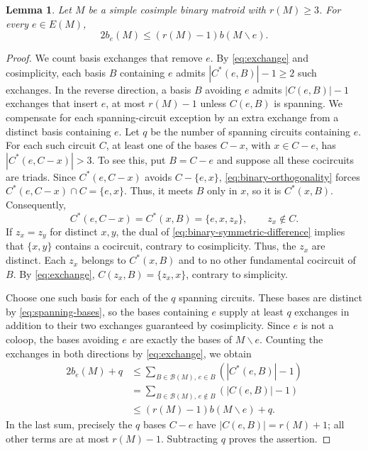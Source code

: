 \documentclass[10pt,a4paper]{article}
\numberwithin{equation}{section}
\newtheorem{lemma}[lemma]{Lemma}
\newcommand{\BB}{\mathcal B}
\begin{document}
\begin{lemma}\label{lem:exchange-count}
Let \(M\) be a simple cosimple binary matroid with \(r(M)\ge3\).
For every \(e\in E(M)\),
\[
 2b_e(M)\le(r(M)-1)b(M\backslash e).
\]
\end{lemma}
\begin{proof}
We count basis exchanges that remove \(e\). By \eqref{eq:exchange}
and cosimplicity, each basis \(B\) containing \(e\) admits
\(|C^*(e,B)|-1\ge2\) such exchanges. In the reverse direction,
a basis \(B\) avoiding \(e\) admits \(|C(e,B)|-1\) exchanges that
insert \(e\), at most \(r(M)-1\) unless \(C(e,B)\) is spanning.
We compensate for each spanning-circuit exception by an extra exchange
from a distinct basis containing \(e\).
Let \(q\) be the number of spanning circuits containing \(e\).
For each such circuit \(C\), at least one of the bases
\(C-x\), with \(x\in C-e\), has \(|C^*(e,C-x)|>3\).
To see this, put \(B=C-e\) and suppose all these cocircuits
are triads. Since \(C^*(e,C-x)\) avoids \(C-\{e,x\}\),
\eqref{eq:binary-orthogonality} forces
\(C^*(e,C-x)\cap C=\{e,x\}\).
Thus, it meets \(B\) only in \(x\), so it is \(C^*(x,B)\).
Consequently,
\[
 C^*(e,C-x)=C^*(x,B)=\{e,x,z_x\},\qquad z_x\notin C.
\]
If \(z_x=z_y\) for distinct \(x,y\), the dual of
\eqref{eq:binary-symmetric-difference} implies that
\(\{x,y\}\) contains a cocircuit, contrary to cosimplicity.
Thus, the \(z_x\) are distinct. Each \(z_x\) belongs to
\(C^*(x,B)\) and to no other fundamental cocircuit of \(B\).
By \eqref{eq:exchange}, \(C(z_x,B)=\{z_x,x\}\), contrary
to simplicity.

Choose one such basis for each of the \(q\) spanning circuits.
These bases are distinct by \eqref{eq:spanning-bases}, so the
bases containing \(e\) supply at least \(q\) exchanges in addition
to their two exchanges guaranteed by cosimplicity.
Since \(e\) is not a coloop, the bases avoiding \(e\) are exactly
the bases of \(M\backslash e\).
Counting the exchanges in both directions by \eqref{eq:exchange}, we obtain
\begin{align*}
 2b_e(M)+q
 &\le\sum_{B\in\BB(M),\,e\in B} (|C^*(e,B)|-1)\\
 &=\sum_{B\in\BB(M),\,e\notin B} (|C(e,B)|-1)\\
 &\le(r(M)-1)b(M\backslash e)+q.
\end{align*}
In the last sum, precisely the \(q\) bases \(C-e\) have
\(|C(e,B)|=r(M)+1\); all other terms are at most \(r(M)-1\).
Subtracting \(q\) proves the assertion.
\end{proof}
\end{document}
